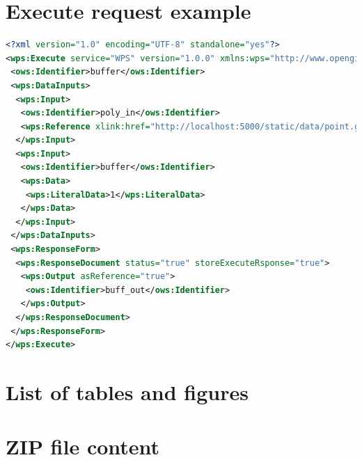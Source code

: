 \documentclass[12pt,a4paper]{article}
\begin{document}
\newpage
\section{Execute request example}
\label{app:ExecuteRequest}
\begin{lstlisting}[basicstyle=\small,caption={Execute request example},language=XML]
<?xml version="1.0" encoding="UTF-8" standalone="yes"?>
<wps:Execute service="WPS" version="1.0.0" xmlns:wps="http://www.opengis.net/wps/1.0.0" xmlns:ows="http://www.opengis.net/ows/1.1" xmlns:xlink="http://www.w3.org/1999/xlink" xmlns:xsi="http://www.w3.org/2001/XMLSchema-instance" xsi:schemaLocation="http://www.opengis.net/wps/1.0.0 ../wpsExecute_request.xsd">
 <ows:Identifier>buffer</ows:Identifier>
 <wps:DataInputs>
  <wps:Input>
   <ows:Identifier>poly_in</ows:Identifier>
   <wps:Reference xlink:href="http://localhost:5000/static/data/point.gml" />
  </wps:Input>
  <wps:Input>
   <ows:Identifier>buffer</ows:Identifier>
   <wps:Data>
    <wps:LiteralData>1</wps:LiteralData>
   </wps:Data>
  </wps:Input>
 </wps:DataInputs>
 <wps:ResponseForm>
  <wps:ResponseDocument status="true" storeExecuteRsponse="true">
   <wps:Output asReference="true">
    <ows:Identifier>buff_out</ows:Identifier>
   </wps:Output>
  </wps:ResponseDocument>
 </wps:ResponseForm>
</wps:Execute>
\end{lstlisting}

\newpage
\section{List of tables and figures}
\listoftables

\listoffigures

\newpage
\section{ZIP file content}
\end{document}
